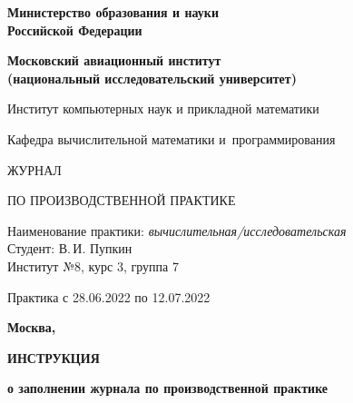 \documentclass[dvipsnames,pdf, unicode, 12pt, a4paper, oneside, fleqn]{article}
\begin{document}
\begin{titlepage}
\begin{center}
\bfseries{\Large Министерство образования и науки\\Российской Федерации}

\vspace{12pt}

\bfseries{\Large Московский авиационный институт\\ (национальный исследовательский университет)}

\vspace{48pt}


{\large Институт компьютерных наук и прикладной математики}

\vspace{36pt}


{\large Кафедра вычислительной математики и~программирования}

\vspace{48pt}

{\huge ЖУРНАЛ}

\vspace{12pt}

{\large ПО ПРОИЗВОДСТВЕННОЙ ПРАКТИКЕ}


\end{center}

\vspace{72pt}

\begin{flushleft}
Наименование практики: {\itshape вычислительная/исследовательская}\\
Студент: В.\,И. Пупкин \\
Институт №8, курс 3, группа 7 \\
\end{flushleft}

\vspace{12pt}

\begin{flushleft}
Практика с 28.06.2022 по 12.07.2022
\end{flushleft}

\vfill

\begin{center}
\bfseries Москва, \the\year
\end{center}
\end{titlepage}

\pagebreak

\begin{center}
\bfseries{\large ИНСТРУКЦИЯ }

\vspace{12pt}

\bfseries{о заполнении журнала по производственной практике}
\end{center}
\end{document}
